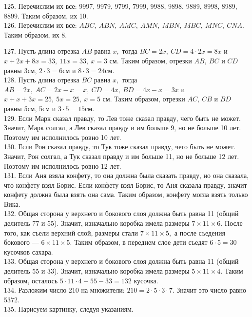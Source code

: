 125. Перечислим их все: 9997, 9979, 9799, 7999, 9988, 9898, 9889, 8998, 8989, 8899. Таким образом, их 10.\\
126. Перечислим их все: $ABC,\ ABN,\ AMC,\ AMN,\ MBN,\ MBC,\ MNC,\ CNA.$ Таким образом, их 8.
\begin{center}
\begin{figure}[ht!]
\end{figure}
\end{center}
127.  Пусть длина отрезка $AB$ равна $x,$ тогда $BC=2x,\ CD=4\cdot2x=8x$ и $x+2x+8x=33,\ 11x=33,\ x=3$ см. Таким образом, отрезки $AB,\ BC$ и $CD$ равны 3см, $2\cdot3=6$см и $8\cdot3=24$см.\\
128. Пусть длина отрезка $BC$ равна $x,$ тогда $AB=2x,\ AC=2x-x=x,\ CD=4x,\ BD=4x-x=3x$ и $x+x+3x=25,\ 5x=25,\ x=5$ см. Таким образом, отрезки $AC,\ CB$ и $BD$ равны 5см, 5см и $3\cdot5=15$см.\\
129. Если Марк сказал правду, то Лев тоже сказал правду, чего быть не может. Значит, Марк солгал, а Лев сказал правду и им больше 9, но не больше 10 лет. Поэтому им исполнилось ровно 10 лет.\\
130. Если Рон сказал правду, то Тук тоже сказал правду, чего быть не может. Значит, Рон солгал, а Тук сказал правду и им больше 11, но не больше 12 лет. Поэтому им исполнилось ровно 12 лет.\\
131. Если Аня взяла конфету, то она должна была сказать правду, но она сказала, что конфету взял Борис. Если конфету взял Борис, то Аня сказала правду, значит конфету должна была взять она сама. Таким образом, конфету могла взять только Вика.\\
132. Общая сторона у верхнего и бокового слоя должна быть равна 11 (общий делитель 77 и 55). Значит, изначально коробка имела размеры $7\times11\times6.$ После того, как съели верхний слой, размеры стали $7\times11\times5,$ а после съедения бокового --- $6\times11\times5.$ Таким образом, в переднем слое дети съедят $6\cdot5=30$ кусочков сахара.\\
133. Общая сторона у верхнего и бокового слоя должна быть равна 11 (общий делитель 55 и 33). Значит, изначально коробка имела размеры $5\times11\times4.$ Таким образом, осталось $5\cdot11\cdot4-55-33=132$ кусочка.\\
134. Разложим число 210 на множители: $210=2\cdot5\cdot3\cdot7.$ Значит это число равно 5372.\\
135. Нарисуем картинку, следуя указаниям.
\begin{center}
\begin{figure}[ht!]
\end{figure}
\end{center}
